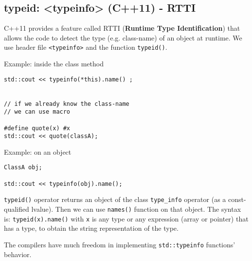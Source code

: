 \subsection{typeid: <typeinfo> (C++11) - RTTI}
\label{sec:type_info}
\label{sec:typeid}
\label{sec:RTTI}

C++11 provides a feature called RTTI ({\bf Runtime Type Identification}) that
allows the code to detect the type (e.g. class-name) of an object at runtime.
We use header file \verb!<typeinfo>! and the function \verb!typeid()!.

Example: inside the class method
\begin{verbatim}
std::cout << typeinfo(*this).name() ;


// if we already know the class-name
// we can use macro

#define quote(x) #x
std::cout << quote(classA);

\end{verbatim}

Example: on an object
\begin{verbatim}
ClassA obj;

std::cout << typeinfo(obj).name();
\end{verbatim}


\verb!typeid()! operator returns an object of the class \verb!type_info! operator (as a const-qualified lvalue). 
Then we can use \verb!names()! function on that object.
The syntax is: \verb!typeid(x).name()! with \verb!x! is  any type or any
expression (array or pointer) that has a type, to obtain the string
representation of the type.

The compilers have much freedom in implementing \verb!std::typeinfo! functions'
behavior. 


